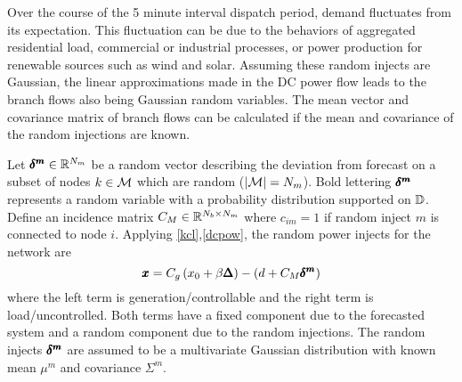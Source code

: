 Over the course of the 5 minute interval dispatch period, demand  fluctuates from its expectation.  This  fluctuation can be due to the behaviors of aggregated residential load, commercial or industrial processes, or power production for renewable sources such as wind and solar.  Assuming these random injects are Gaussian, the linear approximations made in the DC power flow leads to the branch flows also being Gaussian random variables.  The mean vector and covariance matrix of branch flows can be calculated if the mean and covariance of the random injections are known.

Let $\pmb{\delta^m} \in \mathbb{R}^{N_m}$ be a random vector describing the deviation from forecast on a subset of nodes $k \in \mathcal{M}$ which are random ($| \mathcal{M} | = N_m$).  Bold lettering $\pmb{\delta^m}$ represents a random variable with a probability distribution supported on $\mathbb{D}$.  Define an incidence matrix $C_M \in \mathbb{R}^{N_b \times N_m}$ where $c_{im}=1$ if random inject $m$ is connected to node $i$.  Applying \ref{kcl},\ref{dcpow}, the random power injects for the network are
\begin{equation}\label{rand_inj}
 \pmb{x} = C_g\left(x_0+\beta \pmb{\Delta}\right) - (d + C_M \pmb{\delta^m}) 
\end{equation}
 where the left term is generation/controllable and the right term is load/uncontrolled.  Both terms have a fixed component due to the forecasted system and a random component due to the random injections.  The random injects $\pmb{\delta^m}$ are assumed to be a multivariate Gaussian distribution with known mean $\mu^m$ and covariance $\Sigma^m$.  


